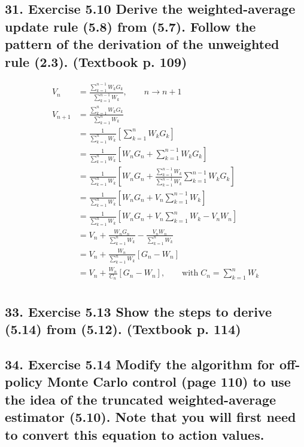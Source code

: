 \subsection*{31. Exercise 5.10 Derive the weighted-average update rule (5.8) from (5.7). Follow the pattern of the derivation of the unweighted rule (2.3). (Textbook p. 109)}
\begin{align*}
V_n &= \frac{\sum_{k=1}^{n-1}W_kG_k}{\sum_{k=1}^{n-1}W_k}, \quad \quad n \rightarrow n+1\\
V_{n+1} &= \frac{\sum_{k=1}^{n}W_kG_k}{\sum_{k=1}^{n}W_k} \\
&= \frac{1}{\sum_{k=1}^{n}W_k}\left[\sum_{k=1}^{n}W_kG_k\right]\\
&= \frac{1}{\sum_{k=1}^{n}W_k}\left[ W_nG_n + \sum_{k=1}^{n-1}W_kG_k \right]\\
&= \frac{1}{\sum_{k=1}^{n}W_k}\left[ W_nG_n + \frac{\sum_{k=1}^{n-1}W_k}{\sum_{k=1}^{n-1}W_k} \sum_{k=1}^{n-1}W_kG_k \right] \\
&= \frac{1}{\sum_{k=1}^{n}W_k}\left[ W_nG_n + V_n\sum_{k=1}^{n-1}W_k \right] \\
&= \frac{1}{\sum_{k=1}^{n}W_k}\left[ W_nG_n + V_n\sum_{k=1}^{n}W_k - V_nW_n \right]\\ 
&= V_n + \frac{W_nG_n}{\sum_{k = 1}^{n}W_k} - \frac{V_nW_n}{\sum_{k = 1}^{n}W_k} \\
&= V_n + \frac{W_n}{\sum_{k = 1}^{n}W_k}\left[ G_n - W_n \right] \\
&= V_n + \frac{W_n}{C_n}\left[ G_n - W_n \right],\quad \quad \text{with}\; C_n = \sum_{k=1}^n W_k \\
\end{align*}
\subsection*{33. Exercise 5.13 Show the steps to derive (5.14) from (5.12). (Textbook p. 114)}

\subsection*{34. Exercise 5.14 Modify the algorithm for off-policy Monte Carlo control (page 110) to use the idea of the truncated weighted-average estimator (5.10). Note that you will first need to convert this equation to action values.}
\newpage


